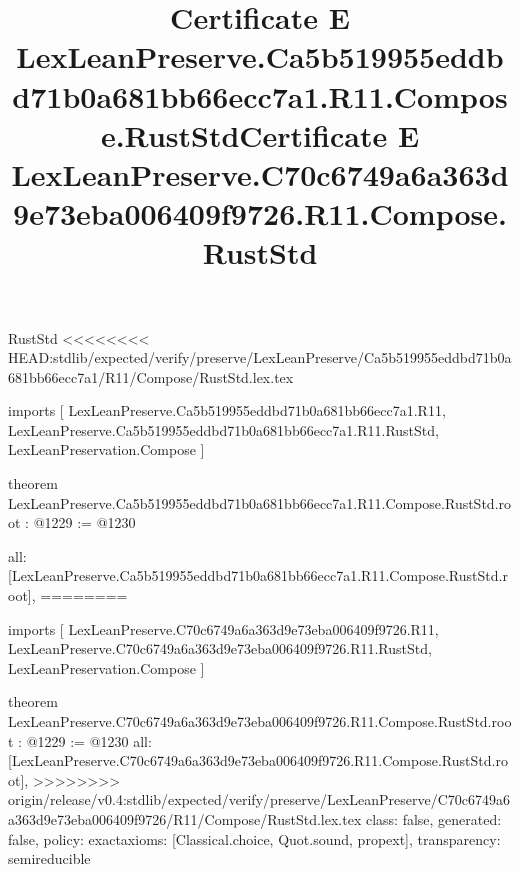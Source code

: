 \begin{lexlean}{RustStd}
<<<<<<<< HEAD:stdlib/expected/verify/preserve/LexLeanPreserve/Ca5b519955eddbd71b0a681bb66ecc7a1/R11/Compose/RustStd.lex.tex
\title{Certificate E LexLeanPreserve.Ca5b519955eddbd71b0a681bb66ecc7a1.R11.Compose.RustStd}
\begin{coremodule}
imports [
  LexLeanPreserve.Ca5b519955eddbd71b0a681bb66ecc7a1.R11,
  LexLeanPreserve.Ca5b519955eddbd71b0a681bb66ecc7a1.R11.RustStd,
  LexLeanPreservation.Compose
]

theorem LexLeanPreserve.Ca5b519955eddbd71b0a681bb66ecc7a1.R11.Compose.RustStd.root : @1229 := @1230 {
  all: [LexLeanPreserve.Ca5b519955eddbd71b0a681bb66ecc7a1.R11.Compose.RustStd.root],
========
\title{Certificate E LexLeanPreserve.C70c6749a6a363d9e73eba006409f9726.R11.Compose.RustStd}
\begin{coremodule}
imports [
  LexLeanPreserve.C70c6749a6a363d9e73eba006409f9726.R11,
  LexLeanPreserve.C70c6749a6a363d9e73eba006409f9726.R11.RustStd,
  LexLeanPreservation.Compose
]

theorem LexLeanPreserve.C70c6749a6a363d9e73eba006409f9726.R11.Compose.RustStd.root : @1229 := @1230 {
  all: [LexLeanPreserve.C70c6749a6a363d9e73eba006409f9726.R11.Compose.RustStd.root],
>>>>>>>> origin/release/v0.4:stdlib/expected/verify/preserve/LexLeanPreserve/C70c6749a6a363d9e73eba006409f9726/R11/Compose/RustStd.lex.tex
  class: false,
  generated: false,
  policy: exact{axioms: [Classical.choice, Quot.sound, propext]},
  transparency: semireducible
}


\end{coremodule}}
\end{coremodule}
\end{lexlean}
